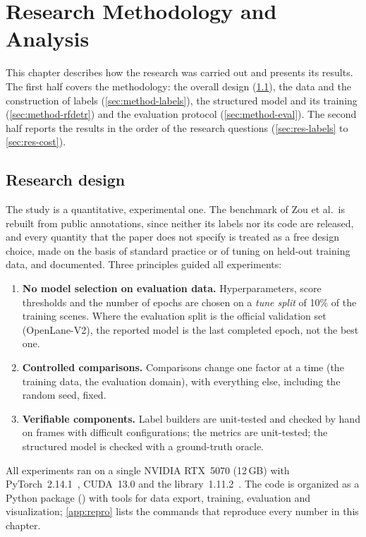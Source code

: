 \chapter{Research Methodology and Analysis}
\label{ch:method}

This chapter describes how the research was carried out and presents its results. The first half
covers the methodology: the overall design (\cref{sec:method-design}), the data and the construction
of labels (\cref{sec:method-labels}), the structured model and its training (\cref{sec:method-rfdetr})
and the evaluation protocol (\cref{sec:method-eval}). The second half reports the results in the order
of the research questions (\cref{sec:res-labels} to \cref{sec:res-cost}).

\section{Research design}
\label{sec:method-design}

The study is a quantitative, experimental one. The benchmark of Zou et al.\ is rebuilt from public
annotations, since neither its labels nor its code are released, and every quantity that the paper does
not specify is treated as a free design choice, made on the basis of standard practice or of tuning on
held-out training data, and documented. Three principles guided all experiments:
\begin{enumerate}
  \item \textbf{No model selection on evaluation data.} Hyperparameters, score thresholds and the
        number of epochs are chosen on a \emph{tune split} of 10\% of the training scenes. Where the
        evaluation split is the official validation set (OpenLane-V2), the reported model is the last
        completed epoch, not the best one.
  \item \textbf{Controlled comparisons.} Comparisons change one factor at a time (the training data, the
        evaluation domain), with everything else, including the random seed, fixed.
  \item \textbf{Verifiable components.} Label builders are unit-tested and checked by hand on frames
        with difficult configurations; the metrics are unit-tested; the structured model is checked
        with a ground-truth oracle.
\end{enumerate}

All experiments ran on a single NVIDIA RTX~5070 (12\,GB) with PyTorch~2.14.1~, CUDA~13.0 and
the  library~1.11.2~. The code is organized as a Python package () with tools for data export,
training, evaluation and visualization; \cref{app:repro} lists the commands that reproduce every
number in this chapter.


